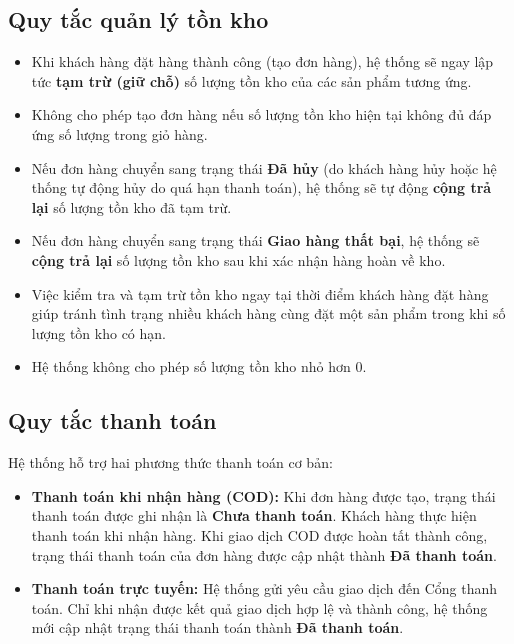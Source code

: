 \subsection{Quy tắc quản lý tồn kho}

\begin{itemize}
\item Khi khách hàng đặt hàng thành công (tạo đơn hàng), hệ thống sẽ ngay lập tức \textbf{tạm trừ (giữ chỗ)} số lượng tồn kho của các sản phẩm tương ứng.
\item Không cho phép tạo đơn hàng nếu số lượng tồn kho hiện tại không đủ đáp ứng số lượng trong giỏ hàng.
\item Nếu đơn hàng chuyển sang trạng thái \textbf{Đã hủy} (do khách hàng hủy hoặc hệ thống tự động hủy do quá hạn thanh toán), hệ thống sẽ tự động \textbf{cộng trả lại} số lượng tồn kho đã tạm trừ.
\item Nếu đơn hàng chuyển sang trạng thái \textbf{Giao hàng thất bại}, hệ thống sẽ \textbf{cộng trả lại} số lượng tồn kho sau khi xác nhận hàng hoàn về kho.
\item Việc kiểm tra và tạm trừ tồn kho ngay tại thời điểm khách hàng đặt hàng giúp tránh tình trạng nhiều khách hàng cùng đặt một sản phẩm trong khi số lượng tồn kho có hạn.
\item Hệ thống không cho phép số lượng tồn kho nhỏ hơn 0.
\end{itemize}


\subsection{Quy tắc thanh toán}

Hệ thống hỗ trợ hai phương thức thanh toán cơ bản:

\begin{itemize}
    \item \textbf{Thanh toán khi nhận hàng (COD):} Khi đơn hàng được tạo, trạng thái thanh toán được ghi nhận là \textbf{Chưa thanh toán}. Khách hàng thực hiện thanh toán khi nhận hàng. Khi giao dịch COD được hoàn tất thành công, trạng thái thanh toán của đơn hàng được cập nhật thành \textbf{Đã thanh toán}.

    \item \textbf{Thanh toán trực tuyến:} Hệ thống gửi yêu cầu giao dịch đến Cổng thanh toán. Chỉ khi nhận được kết quả giao dịch hợp lệ và thành công, hệ thống mới cập nhật trạng thái thanh toán thành \textbf{Đã thanh toán}.
\end{itemize}

